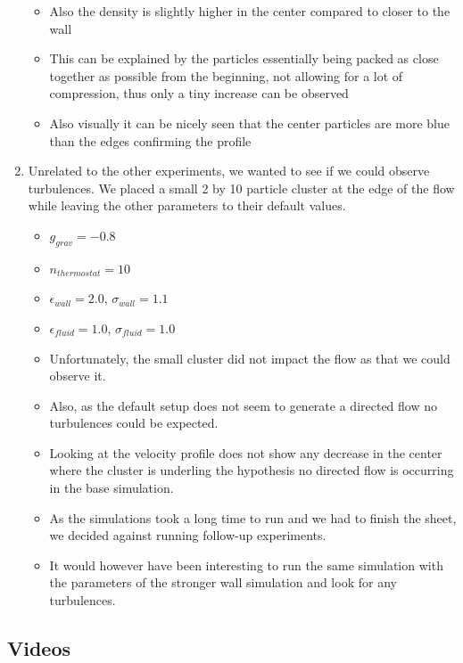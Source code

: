 \documentclass{article}
\begin{document}
\begin{enumerate}
\begin{itemize}
            \item Also the density is slightly higher in the center compared to closer to the wall
            \item This can be explained by the particles essentially being packed as close together as possible from the beginning, not allowing for a lot of compression, thus only a tiny increase can be observed
            \item Also visually it can be nicely seen that the center particles are more blue than the edges confirming the profile
        \end{itemize}
        \item Unrelated to the other experiments, we wanted to see if we could observe turbulences. We placed a small 2 by 10 particle cluster at the edge of the flow while leaving the other parameters to their default values.
        \begin{itemize}
            \item $g_{grav} = -0.8$
            \item $n_{thermostat} = 10$
            \item $\epsilon_{wall} = 2.0$, $\sigma_{wall} = 1.1$
            \item $\epsilon_{fluid} = 1.0$, $\sigma_{fluid} = 1.0$
            \item Unfortunately, the small cluster did not impact the flow as that we could observe it.
            \item Also, as the default setup does not seem to generate a directed flow no turbulences could be expected.
            \item Looking at the velocity profile does not show any decrease in the center where the cluster is underling the hypothesis no directed flow is occurring in the base simulation.
            \item As the simulations took a long time to run and we had to finish the sheet, we decided against running follow-up experiments.
            \item It would however have been interesting to run the same simulation with the parameters of the stronger wall simulation and look for any turbulences.
        \end{itemize}
        
    \end{enumerate}

\subsection{Videos}
\label{sec:nano:video}
\end{document}
